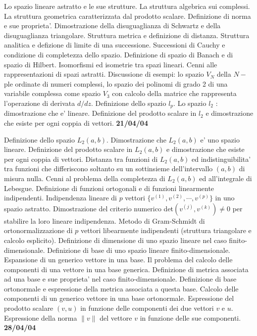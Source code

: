 \documentclass[a4paper,10pt]{article}
\begin{document}
\noindent
Lo spazio lineare astratto e le sue strutture. La struttura algebrica sui
complessi. La struttura geometrica caratterizzata dal prodotto scalare.
Definizione di norma e sue proprieta'. Dimostrazione della disuguaglianza
di Schwartz e della disuguaglianza triangolare. Struttura metrica e
definizione di distanza. Struttura analitica e defizione di limite di una
successione. Successioni di Cauchy e condizione di completezza dello
spazio. Definizione di spazio di Banach e di spazio di Hilbert.
Isomorfismi ed isometrie tra spazi lineari. Cenni alle rappresentazioni
di spazi astratti. Discussione di esempi: lo spazio $V_N$ della $N-$ple
ordinate di numeri complessi, lo spazio dei polinomi di grado 2 di una
variabile complessa come spazio $V_3$ con calcolo della matrice che
rappresenta l'operazione di derivata $d/dz$. Definizione dello spazio
$l_p$. Lo spazio $l_2$ : dimostrazione che e' lineare. Definizione del
prodotto scalare in $l_2$ e dimostrazione che esiste per ogni coppia di
vettori.
\vskip 12pt
\noindent
\textbf{21/04/04}

\noindent
Definizione dello spazio $L_2(a,b)$. Dimostrazione che
$L_2(a,b)$ e' uno spazio lineare. Definizione del prodotto scalare in
$L_2(a,b)$ e dimostrazione che esiste per ogni coppia di vettori.
Distanza tra funzioni di $L_2(a,b)$ ed indistinguibilita' tra funzioni
che differiscono soltanto su un sottinsieme dell'intervallo $(a,b)$ di
misura nulla. Cenni al problema della completezza di $L_2(a,b)$ ed
all'integrale di Lebesgue. Definizione di funzioni ortogonali e di
funzioni linearmente indipendenti. Indipendenza lineare di $p$ vettori
$\{v^{(1)},v^{(2)},\cdots ,v^{(p)}\}$ in uno spazio astratto.
Dimostrazione del criterio numerico det$(v^{(j)},v^{(k)})\neq 0$ 
per stabilire la loro lineare indipendenza. Metodo di Gram-Schmidt di
ortonormalizzazione di $p$ vettori libearmente indipendenti (struttura
triangolare e calcolo esplicito). Definizione di dimensione di uno spazio
lineare nel caso finito-dimensionale. Definizione di base di uno spazio
lineare finito-dimensionale. Espansione di un generico vettore in una
base. Il problema del calcolo delle componenti di una vettore in una base
generica. Definizione di metrica associata ad una base e sue proprieta'
nel caso finito-dimensionale. Definizione di base ortonormale e
espressione della metrica associata a questa base. Calcolo 
delle componenti di un generico vettore in una base ortonormale.
Espressione del prodotto scalare $(v,u)$ in funzione delle componenti dei
due vettori $v$ e $u$. Espressione della norma $\parallel v\parallel$ del
vettore $v$ in funzione delle sue componenti.
\vskip 12pt
\noindent
\textbf{28/04/04}
\end{document}
